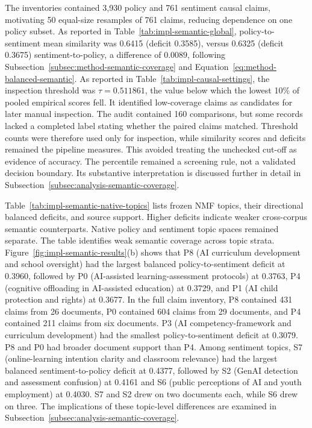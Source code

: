 The inventories contained 3,930 policy and 761 sentiment causal claims, motivating 50
equal-size resamples of 761 claims, reducing dependence on one policy subset. As
reported in Table~\ref{tab:impl-semantic-global}, policy-to-sentiment mean similarity
was 0.6415 (deficit 0.3585), versus 0.6325 (deficit 0.3675) sentiment-to-policy, a
difference of \(0.0089\), following Subsection~\ref{subsec:method-semantic-coverage}
and Equation~\ref{eq:method-balanced-semantic}. As reported in
Table~\ref{tab:impl-causal-settings}, the inspection threshold was \(\tau=0.511861\),
the value below which the lowest 10\% of pooled empirical scores fell. It identified
low-coverage claims as candidates for later manual inspection. The audit contained
160 comparisons, but some records lacked a completed label stating whether the paired
claims matched. Threshold counts were therefore used only for inspection, while
similarity scores and deficits remained the pipeline measures. This avoided treating
the unchecked cut-off as evidence of accuracy. The percentile remained a screening
rule, not a validated decision boundary. Its substantive interpretation is discussed
further in detail in Subsection~\ref{subsec:analysis-semantic-coverage}.

{\color{blue} Table~\ref{tab:impl-semantic-native-topics} lists frozen NMF
topics, their directional balanced deficits, and source support. Higher deficits
indicate weaker cross-corpus semantic counterparts. Native policy and sentiment topic
spaces remained separate. The table identifies weak semantic
coverage across topic strata.} Figure~\ref{fig:impl-semantic-results}(b)
shows that P8 (AI curriculum development and school oversight) had the largest
balanced policy-to-sentiment deficit at 0.3960, followed by P0 (AI-assisted
learning-assessment protocols) at 0.3763, P4 (cognitive offloading in AI-assisted
education) at 0.3729, and P1 (AI child protection and rights) at 0.3677. In the full
claim inventory, P8 contained 431 claims from 26 documents, P0 contained 604 claims
from 29 documents, and P4 contained 211 claims from six documents. P3 (AI
competency-framework and curriculum development) had the smallest policy-to-sentiment
deficit at 0.3079. P8 and P0 had broader document support than P4. Among
sentiment topics, S7 (online-learning intention clarity and classroom relevance) had
the largest balanced sentiment-to-policy deficit at 0.4377, followed by S2 (GenAI
detection and assessment confusion) at 0.4161 and S6 (public perceptions of AI and
youth employment) at 0.4030. S7 and S2 drew on two documents each, while S6 drew on
three. The implications of these topic-level differences are examined in
Subsection~\ref{subsec:analysis-semantic-coverage}.

